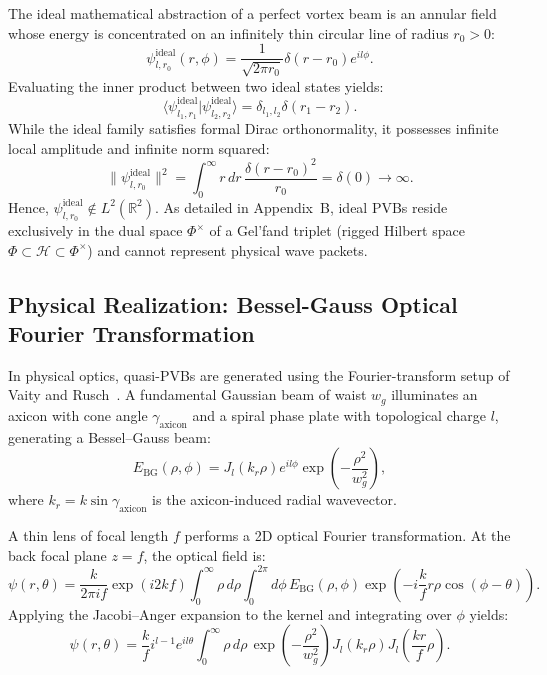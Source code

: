 \documentclass{optica-article}
\begin{document}
The ideal mathematical abstraction of a perfect vortex beam is an annular field whose energy is concentrated on an infinitely thin circular line of radius $r_0 > 0$:
\begin{equation}
\psi_{l, r_0}^{\text{ideal}}(r, \phi) = \frac{1}{\sqrt{2\pi r_0}} \delta(r - r_0) e^{i l \phi}.
\label{eq:ideal_pvb}
\end{equation}
Evaluating the inner product between two ideal states yields:
\begin{equation}
\langle \psi_{l_1, r_1}^{\text{ideal}} | \psi_{l_2, r_2}^{\text{ideal}} \rangle = \delta_{l_1, l_2} \delta(r_1 - r_2).
\end{equation}
While the ideal family satisfies formal Dirac orthonormality, it possesses infinite local amplitude and infinite norm squared:
\begin{equation}
\|\psi_{l, r_0}^{\text{ideal}}\|^2 = \int_0^\infty r \, dr \, \frac{\delta(r - r_0)^2}{r_0} = \delta(0) \to \infty.
\end{equation}
Hence, $\psi_{l, r_0}^{\text{ideal}} \notin L^2(\mathbb{R}^2)$. As detailed in Appendix~B, ideal PVBs reside exclusively in the dual space $\Phi^\times$ of a Gel'fand triplet (rigged Hilbert space $\Phi \subset \mathcal{H} \subset \Phi^\times$) and cannot represent physical wave packets.

\subsection{Physical Realization: Bessel-Gauss Optical Fourier Transformation}

In physical optics, quasi-PVBs are generated using the Fourier-transform setup of Vaity and Rusch~\cite{Vaity2015}. A fundamental Gaussian beam of waist $w_g$ illuminates an axicon with cone angle $\gamma_{\text{axicon}}$ and a spiral phase plate with topological charge $l$, generating a Bessel--Gauss beam:
\begin{equation}
E_{\text{BG}}(\rho, \phi) = J_l(k_r \rho) e^{i l \phi} \exp\left( - \frac{\rho^2}{w_g^2} \right),
\end{equation}
where $k_r = k \sin \gamma_{\text{axicon}}$ is the axicon-induced radial wavevector.

A thin lens of focal length $f$ performs a 2D optical Fourier transformation. At the back focal plane $z = f$, the optical field is:
\begin{equation}
\psi(r, \theta) = \frac{k}{2\pi i f} \exp(i 2k f) \int_0^\infty \rho \, d\rho \int_0^{2\pi} d\phi \, E_{\text{BG}}(\rho, \phi) \exp\left( - i \frac{k}{f} r \rho \cos(\phi - \theta) \right).
\end{equation}
Applying the Jacobi--Anger expansion to the kernel and integrating over $\phi$ yields:
\begin{equation}
\psi(r, \theta) = \frac{k}{f} i^{l-1} e^{i l \theta} \int_0^\infty \rho \, d\rho \, \exp\left( - \frac{\rho^2}{w_g^2} \right) J_l(k_r \rho) J_l\left( \frac{k r}{f} \rho \right).
\end{equation}
\end{document}
